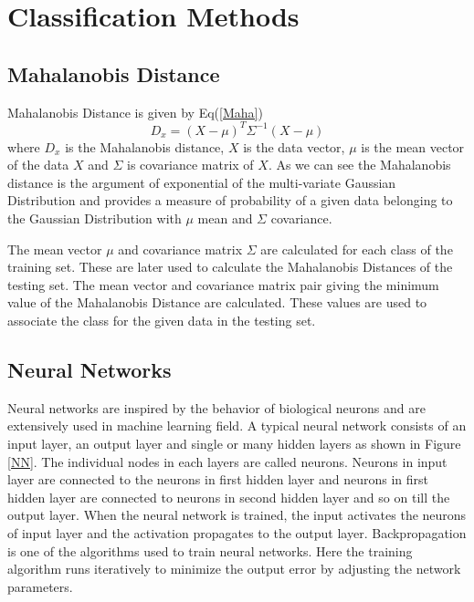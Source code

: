 \documentclass[11pt]{article}
\begin{document}
\section{Classification Methods}
	\subsection{Mahalanobis Distance}
		Mahalanobis Distance is given by Eq(\ref{Maha})
		\begin{equation}
			D_x = (X - \mu)^T  \Sigma ^{-1}  (X - \mu)
			\label{Maha}
		\end{equation}
		where $D_x$ is the Mahalanobis distance, $X$ is the data vector, $\mu$ is the mean vector of the data $X$ and $\Sigma$ is covariance matrix of $X$. As we can see the Mahalanobis distance is the argument of exponential of the multi-variate Gaussian Distribution and provides a measure of probability of a given data belonging to the Gaussian Distribution with $\mu$ mean and $\Sigma$ covariance. \newline

		The mean vector $\mu$ and covariance matrix $\Sigma$ are calculated for each class of the training set. These are later used to calculate the Mahalanobis Distances of the testing set. The mean vector and covariance matrix pair giving the minimum value of the Mahalanobis Distance are calculated. These values are used to associate the class for the given data in the testing set.
		
	\subsection{Neural Networks}
		Neural networks are inspired by the behavior of  biological neurons and are extensively used in machine learning field. A typical neural network consists of an input layer,  an output layer and single or many hidden layers as shown in Figure \ref{NN}. The individual nodes in each layers are called neurons. Neurons in input layer are connected to the neurons in first hidden layer and neurons in first hidden layer are connected to neurons in second hidden layer and so on till the output layer. When the neural network is trained, the input activates the neurons of input layer and the activation propagates to the output layer. Backpropagation is one of the algorithms used to train neural networks. Here the training algorithm runs iteratively to minimize the output error by adjusting the network parameters.
		
\end{document}
